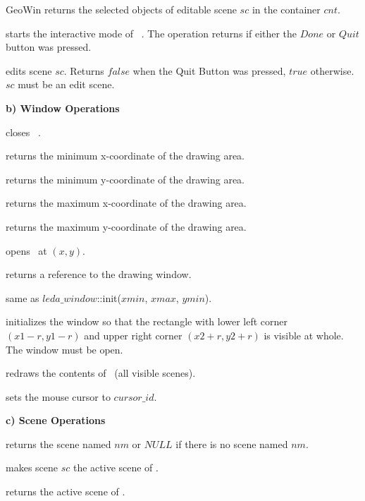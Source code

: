 \begin{ccRefClass}{GeoWin}
{returns the selected objects of editable scene $sc$ in the container $cnt$.} 
 
{starts the interactive mode of \ccVar\ . The operation returns if either the $Done$ or
$Quit$ button was pressed. }

{edits scene $sc$. Returns $false$ when the Quit Button was pressed,
$true$ otherwise. \ccPrecond $sc$ must be an edit scene. }

\medskip
{\bf b) Window Operations}

{closes \ccVar\ .}

{returns the minimum x-coordinate of the drawing area.}
  
{returns the minimum y-coordinate of the drawing area.}
  
{returns the maximum x-coordinate of the drawing area.}
    
{returns the maximum y-coordinate of the drawing area.} 

{opens \ccVar\ at $(x,y)$. }

{returns a reference to the drawing window.}
  
{same as $leda\_window$::init($xmin$, $xmax$, $ymin$).}
  
{initializes the window so that the rectangle with lower 
left corner $(x1-r,y1-r)$ and upper right corner $(x2+r,y2+r)$
is visible at whole. The window must be open.}

{redraws the contents of \ccVar\ (all visible scenes).}

{sets the mouse cursor to $cursor\_id$. }


\clearpage
{\bf c) Scene Operations} 

{returns the scene named $nm$ or $NULL$ if there is no scene
named $nm$.}

{makes scene $sc$ the active scene of \ccVar. }

{returns the active scene of \ccVar. }


\end{ccRefClass}
